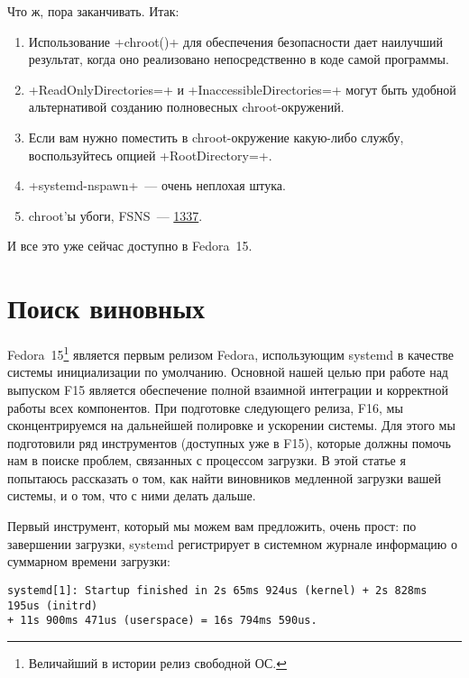 \documentclass[10pt,oneside,a4paper]{article}
\begin{document}
Что ж, пора заканчивать. Итак:
\begin{enumerate}
	\item Использование +chroot()+ для обеспечения безопасности дает
		наилучший результат, когда оно реализовано непосредственно в
		коде самой программы.
	\item +ReadOnlyDirectories=+ и +InaccessibleDirectories=+ могут быть
		удобной альтернативой созданию полновесных chroot-окружений.
	\item Если вам нужно поместить в chroot-окружение какую-либо службу,
		воспользуйтесь опцией +RootDirectory=+.
	\item +systemd-nspawn+~--- очень неплохая штука.
	\item chroot'ы убоги, FSNS~---
		\href{http://ru.wikipedia.org/wiki/Leet}{1337}.
\end{enumerate}

И все это уже сейчас доступно в Fedora~15.

\section{Поиск виновных}

Fedora~15\footnote{Величайший в истории релиз свободной ОС.}
является первым релизом Fedora, использующим systemd в качестве системы
инициализации по умолчанию. Основной нашей целью при работе над выпуском F15
является обеспечение полной взаимной интеграции и корректной работы всех
компонентов. При подготовке следующего релиза, F16, мы сконцентрируемся на
дальнейшей полировке и ускорении системы. Для этого мы подготовили ряд
инструментов (доступных уже в F15), которые должны помочь нам в поиске проблем,
связанных с процессом загрузки. В этой статье я попытаюсь рассказать о том, как
найти виновников медленной загрузки вашей системы, и о том, что с ними делать
дальше.

Первый инструмент, который мы можем вам предложить, очень прост: по завершении
загрузки, systemd регистрирует в системном журнале информацию о суммарном
времени загрузки:
\begin{Verbatim}
systemd[1]: Startup finished in 2s 65ms 924us (kernel) + 2s 828ms 195us (initrd)
+ 11s 900ms 471us (userspace) = 16s 794ms 590us.
\end{Verbatim}
\end{document}
